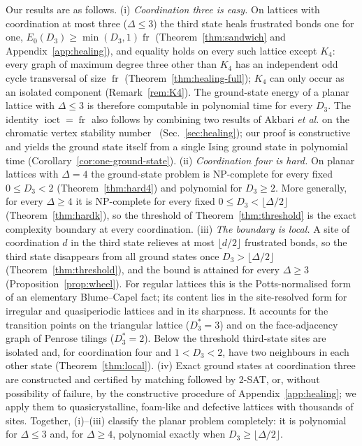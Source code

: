 \documentclass[aps,pre,twocolumn,floatfix,10pt]{revtex4-2}
\theoremstyle{definition}
\theoremstyle{remark}
\newcommand{\fr}{\operatorname{fr}}
\newcommand{\ioct}{\operatorname{ioct}}
\begin{document}
Our results are as follows.
(i) \emph{Coordination three is easy.} On lattices with coordination at most three ($\Delta\le3$)
the third state heals frustrated bonds one for one, $E_0(D_3)\ge\min(D_3,1)\fr$
(Theorem~\ref{thm:sandwich} and Appendix~\ref{app:healing}), and
equality holds on every such lattice except $K_4$: every graph of maximum degree
three other than $K_4$ has an independent odd cycle transversal of size $\fr$
(Theorem~\ref{thm:healing-full}); $K_4$ can only occur as an isolated component
(Remark~\ref{rem:K4}). The ground-state energy of a planar lattice with $\Delta\le3$ is therefore
computable in polynomial time for every $D_3$. The identity $\ioct=\fr$ also follows by combining
two results of Akbari \emph{et al.} on the chromatic vertex stability number~\cite{Akbari2022}
(Sec.~\ref{sec:healing}); our proof is constructive and yields the ground state itself from a
single Ising ground state in polynomial time (Corollary~\ref{cor:one-ground-state}).
(ii) \emph{Coordination four is hard.} On planar lattices with $\Delta=4$ the ground-state
problem is NP-complete for every fixed $0\le D_3<2$ (Theorem~\ref{thm:hard4}) and polynomial for
$D_3\ge2$. More generally, for every $\Delta\ge4$ it is NP-complete for every fixed
$0\le D_3<\lfloor\Delta/2\rfloor$ (Theorem~\ref{thm:hardk}), so the threshold of
Theorem~\ref{thm:threshold} is the exact complexity boundary at every coordination.
(iii) \emph{The boundary is local.} A site of coordination $d$ in the third state relieves at
most $\lfloor d/2\rfloor$ frustrated bonds, so the third state disappears from all ground states
once $D_3>\lfloor\Delta/2\rfloor$ (Theorem~\ref{thm:threshold}), and the bound is attained for every
$\Delta\ge3$ (Proposition~\ref{prop:wheel}). For regular lattices this is the Potts-normalised form
of an elementary Blume--Capel fact; its content lies in the site-resolved form for irregular and
quasiperiodic lattices and in its sharpness. It accounts for the transition points on the
triangular lattice ($D_3^*=3$) and on the face-adjacency graph of Penrose tilings ($D_3^*=2$). Below the threshold third-state sites are
isolated and, for coordination four and $1<D_3<2$, have two neighbours in each other state
(Theorem~\ref{thm:local}).
(iv) Exact ground states at coordination three are constructed and certified by matching
followed by 2-SAT, or, without possibility of failure, by the constructive procedure of
Appendix~\ref{app:healing}; we apply them to quasicrystalline, foam-like and defective lattices
with thousands of sites.
Together, (i)--(iii) classify the planar problem completely: it is polynomial for $\Delta\le3$
and, for $\Delta\ge4$, polynomial exactly when $D_3\ge\lfloor\Delta/2\rfloor$.
\end{document}
